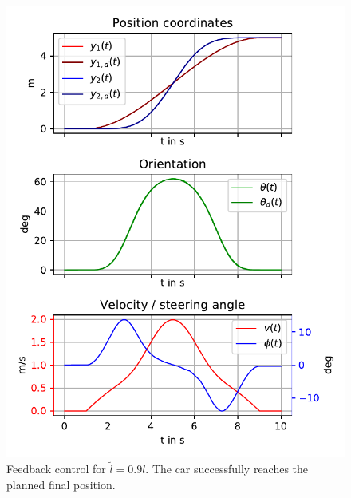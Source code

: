 \documentclass[a4paper,12pt,headinclude=true,headsepline,parskip=half,DIV=12]{scrartcl}
\begin{document}
\begin{figure}[ht]
  \centering
  \includegraphics[scale=0.9]{img/successcontrol.pdf}
  \caption{Feedback control for $\tilde{l}=0.9l$. The car successfully reaches the planned final position.}
  \label{fig:success_control}
\end{figure}
\newpage
\clearpage
\end{document}
